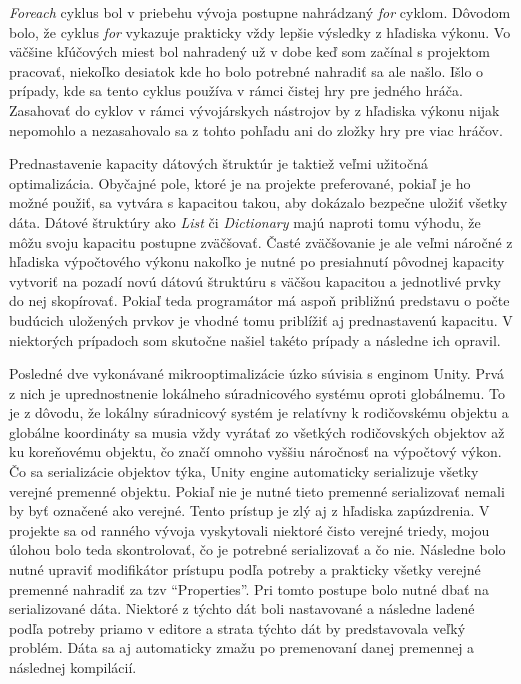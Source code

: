 \documentclass[slovak, bachelorpractice]{diploma}
\begin{document}
\textit{Foreach} cyklus bol v priebehu vývoja postupne nahrádzaný \textit{for} cyklom. Dôvodom bolo, že cyklus \textit{for} vykazuje prakticky vždy lepšie výsledky z hľadiska výkonu. Vo väčšine kľúčových miest bol nahradený už v dobe keď som začínal s projektom pracovať, niekoľko desiatok kde ho bolo potrebné nahradiť sa ale našlo. Išlo o prípady, kde sa tento cyklus používa v rámci čistej hry pre jedného hráča. Zasahovať do cyklov v rámci vývojárskych nástrojov by z hľadiska výkonu nijak nepomohlo a nezasahovalo sa z tohto pohľadu ani do zložky hry pre viac hráčov.

Prednastavenie kapacity dátových štruktúr je taktiež veľmi užitočná optimalizácia. Obyčajné pole, ktoré je na projekte preferované, pokiaľ je ho možné použiť, sa vytvára s kapacitou takou, aby dokázalo bezpečne uložiť všetky dáta. Dátové štruktúry ako \textit{List} či \textit{Dictionary} majú naproti tomu výhodu, že môžu svoju kapacitu postupne zväčšovať. Časté zväčšovanie je ale veľmi náročné z hľadiska výpočtového výkonu nakoľko je nutné po presiahnutí pôvodnej kapacity vytvoriť na pozadí novú dátovú štruktúru s väčšou kapacitou a jednotlivé prvky do nej skopírovať. Pokiaľ teda programátor má aspoň približnú predstavu o počte budúcich uložených prvkov je vhodné tomu priblížiť aj prednastavenú kapacitu. V niektorých prípadoch som skutočne našiel takéto prípady a následne ich opravil.

Posledné dve vykonávané mikrooptimalizácie úzko súvisia s enginom Unity. Prvá z nich je uprednostnenie lokálneho súradnicového systému oproti globálnemu. To je z dôvodu, že lokálny súradnicový systém je relatívny k rodičovskému objektu a globálne koordináty sa musia vždy vyrátať zo všetkých rodičovských objektov až ku koreňovému objektu, čo značí omnoho vyššiu náročnosť na výpočtový výkon. Čo sa serializácie objektov týka, Unity engine automaticky serializuje všetky verejné premenné objektu. Pokiaľ nie je nutné tieto premenné serializovať nemali by byť označené ako verejné. Tento prístup je zlý aj z hľadiska zapúzdrenia. V projekte sa od ranného vývoja vyskytovali niektoré čisto verejné triedy, mojou úlohou bolo teda skontrolovať, čo je potrebné serializovať a čo nie. Následne bolo nutné upraviť modifikátor prístupu podľa potreby a prakticky všetky verejné premenné nahradiť za tzv \enquote{Properties}. Pri tomto postupe bolo nutné dbať na serializované dáta. Niektoré z týchto dát boli nastavované a následne ladené podľa potreby priamo v editore a strata týchto dát by predstavovala veľký problém. Dáta sa aj automaticky zmažu po premenovaní danej premennej a následnej kompilácií. 
\end{document}

